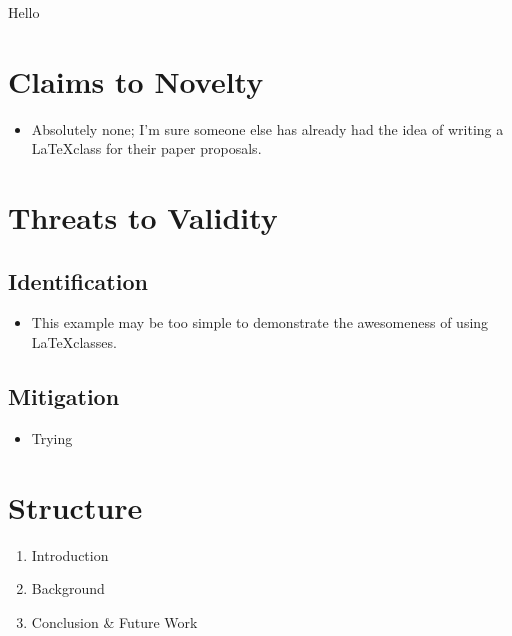 \documentclass{paper_proposal}
\begin{document}

Hello

%
\section{Claims to Novelty}
\begin{itemize}
  \item Absolutely none; I'm sure someone else has already had the idea of
    writing a \LaTeX class for their paper proposals.
\end{itemize}

\section{Threats to Validity}
\subsection{Identification}
\begin{itemize}
  \item This example may be too simple to demonstrate the awesomeness of using
    \LaTeX classes.
\end{itemize}

\subsection{Mitigation}
\begin{itemize}
  \item Trying 
\end{itemize}

\section{Structure}

\begin{enumerate}
  \item Introduction
  \item Background
  \item Conclusion \& Future Work
\end{enumerate}
\end{document}
